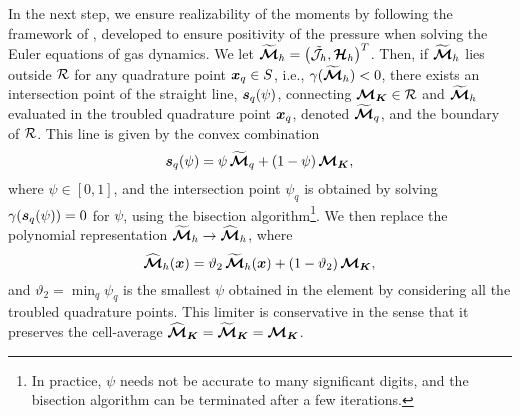 In the next step, we ensure realizability of the moments by following the framework of \cite{zhangShu_2010b}, developed to ensure positivity of the pressure when solving the Euler equations of gas dynamics.  
We let $\widetilde{\boldsymbol{\mathcal{M}}}_{h}=\big(\tilde{\mathcal{J}}_{h},\boldsymbol{\mathcal{H}}_{h}\big)^{T}$.  
Then, if $\widetilde{\boldsymbol{\mathcal{M}}}_{h}$ lies outside $\mathcal{R}$ for any quadrature point $\boldsymbol{x}_{q}\in S$, i.e., $\gamma(\widetilde{\boldsymbol{\mathcal{M}}}_{h})<0$, there exists an intersection point of the straight line, $\boldsymbol{s}_{q}(\psi)$, connecting $\boldsymbol{\mathcal{M}}_{\boldsymbol{K}}\in\mathcal{R}$ and $\widetilde{\boldsymbol{\mathcal{M}}}_{h}$ evaluated in the troubled quadrature point $\boldsymbol{x}_{q}$, denoted $\widetilde{\boldsymbol{\mathcal{M}}}_{q}$, and the boundary of $\mathcal{R}$.  
This line is given by the convex combination 
\begin{equation}
  \boldsymbol{s}_{q}(\psi)=\psi\,\widetilde{\boldsymbol{\mathcal{M}}}_{q}+(1-\psi)\,\boldsymbol{\mathcal{M}}_{\boldsymbol{K}},
\end{equation}
where $\psi\in[0,1]$, and the intersection point $\psi_{q}$ is obtained by solving $\gamma(\boldsymbol{s}_{q}(\psi))=0$ for $\psi$, using the bisection algorithm\footnote{In practice, $\psi$ needs not be accurate to many significant digits, and the bisection algorithm can be terminated after a few iterations.}.  
We then replace the polynomial representation $\widetilde{\boldsymbol{\mathcal{M}}}_{h}\to\widehat{\boldsymbol{\mathcal{M}}}_{h}$, where
\begin{equation}
  \widehat{\boldsymbol{\mathcal{M}}}_{h}(\boldsymbol{x})=\vartheta_{2}\,\widetilde{\boldsymbol{\mathcal{M}}}_{h}(\boldsymbol{x})+(1-\vartheta_{2})\,\boldsymbol{\mathcal{M}}_{\boldsymbol{K}},
  \label{eq:limitMoments}
\end{equation}
and $\vartheta_{2}=\min_{q}\psi_{q}$ is the smallest $\psi$ obtained in the element by considering all the troubled quadrature points.  
This limiter is conservative in the sense that it preserves the cell-average $\widehat{\boldsymbol{\mathcal{M}}}_{\boldsymbol{K}}=\widetilde{\boldsymbol{\mathcal{M}}}_{\boldsymbol{K}}=\boldsymbol{\mathcal{M}}_{\boldsymbol{K}}$.  


